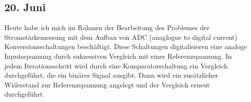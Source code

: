 \subsection{20. Juni}
Heute habe ich mich im Rahmen der Bearbeitung des Problemes der Stromstärkemessung mit dem Aufbau von ADC (anaglogue to digital current) Konversionsschaltungen beschäftigt. Diese Schaltungen digitalisieren eine analoge Inputsspannung durch sukzessiven Vergleich mit einer Referenzspannung. In jedem Iterationsschritt wird durch eine Komparatorschaltung ein Vergleich durchgeführt, die ein binäres Signal ausgibt. Dann wird ein zusätzlicher Widerstand zur Referenzspannung angelegt und der Vergleich erneut durchgeführt.